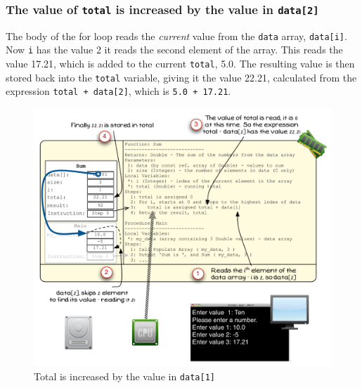 \clearpage
\subsubsection{The value of \texttt{total} is increased by the value in \texttt{data[2]}} %
\label{ssub:the_value_of_total_is_increased_by_the_value_in_data[2]}

The body of the for loop reads the \emph{current} value from the \texttt{data} array, \texttt{data[i]}. Now \texttt{i} has the value 2 it reads the second element of the array. This reads the value 17.21, which is added to the current \texttt{total}, 5.0. The resulting value is then stored back into the \texttt{total} variable, giving it the value 22.21, calculated from the expression \texttt{total + data[2]}, which is \texttt{5.0 + 17.21}.

\begin{figure}[htbp]
   \centering
   \includegraphics[width=\textwidth]{./topics/arrays/images/Sum8} 
   \caption{Total is increased by the value in \texttt{data[1]}}
   \label{fig:sum-array-vis-8}
\end{figure}

